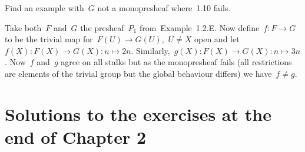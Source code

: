 \documentclass[a4paper,11pt,oneside,openany,article]{memoir}
\begin{document}
\begin{exercise}[1.12]
  Find an example with~$G$ not a monopresheaf where~1.10 fails.

  \begin{solution}
    Take both~$F$ and~$G$ the presheaf~$P_1$ from~Example~1.2.E. Now define~$f\colon F\to G$ to be the trivial map for~$F(U)\to G(U)$,~$U\neq X$ open and let~$f(X)\colon F(X)\to G(X):n\mapsto 2n$. Similarly,~$g(X)\colon F(X)\to G(X):n\mapsto 3n$. Now~$f$ and~$g$ agree on all stalks but as the monopresheaf fails (all restrictions are elements of the trivial group but the global behaviour differs) we have~$f\neq g$.
  \end{solution}
\end{exercise}

\clearpage

\chapter{Solutions to the exercises at the end of Chapter 2}
\end{document}
